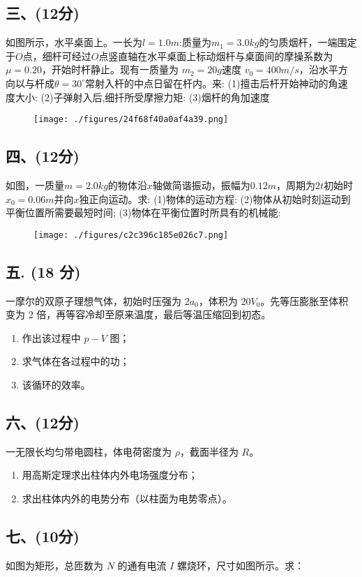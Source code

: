\subsection{三、(12分)}
如图所示，水平桌面上。一长为$l = 1.0m$:质量为$m_1 = 3.0kg$的匀质烟杆，一端围定于$O$点，细杆可经过$O$点竖直轴在水平桌面上标动烟杆与桌面间的摩操系数为$\mu=0.20$，开始时杆静止。现有一质量为 $m_2 = 20g$速度 $v_0 = 400m/s$，沿水平方向以与杆成$\theta = 30^\circ$常射入杆的中点日留在杆内。来:
(1)擅击后杆开始神动的角速度大小:
(2)子弹射入后,细扦所受摩擦力矩:
(3)烟杆的角加速度
\begin{figure}[ht]
\centering
\texttt{[image: ./figures/24f68f40a0af4a39.png]}
\caption{} \label{fig_NJU10_5}
\end{figure}
\subsection{四、(12分)}
如图，一质量$m=2.0kg$的物体沿$x$轴做简谐振动，振幅为$0.12m$，周期为$2t$初始时$x_0=0.06m$并向$x$独正向运动。求:
(1)物体的运动方程:
(2)物体从初始时刻运动到平衡位置所需要最短时间;
(3)物体在平衡位置时所具有的机械能:
\begin{figure}[ht]
\centering
\texttt{[image: ./figures/c2c396c185e026c7.png]}
\caption{} \label{fig_NJU10_6}
\end{figure}
\subsection{五. (18 分)}
一摩尔的双原子理想气体，初始时压强为 $2a_0$，体积为 $20V_0$。先等压膨胀至体积变为 2 倍，再等容冷却至原来温度，最后等温压缩回到初态。
\begin{enumerate}
    \item 作出该过程中 $p-V$ 图；
    \item 求气体在各过程中的功；
    \item 该循环的效率。
\end{enumerate}
\subsection{六、(12分)}
一无限长均匀带电圆柱，体电荷密度为 $\rho$，截面半径为 $R$。
\begin{enumerate}
    \item 用高斯定理求出柱体内外电场强度分布；
    \item 求出柱体内外的电势分布（以柱面为电势零点）。
\end{enumerate}
\subsection{七、(10分)}
如图为矩形，总匝数为 $N$ 的通有电流 $I$ 螺烧环，尺寸如图所示。求：

